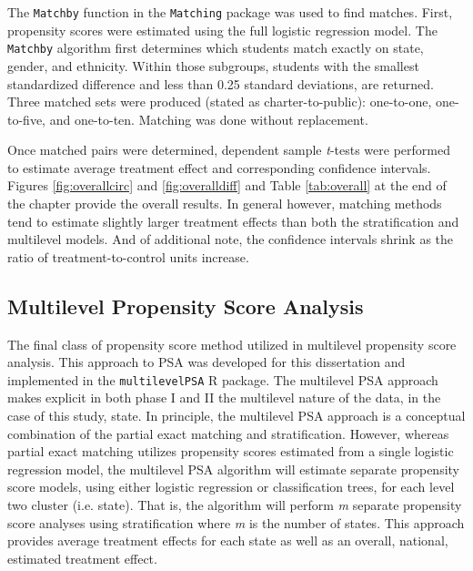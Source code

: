 \documentclass[letterpaper,12p,twoside]{article} %
\begin{document}
The \texttt{Matchby} function in the \texttt{Matching} package \cite{matching} was used to find matches. First, propensity scores were estimated using the full logistic regression model. The \texttt{Matchby} algorithm first determines which students match exactly on state, gender, and ethnicity. Within those subgroups, students with the smallest standardized difference and less than 0.25 standard deviations, are returned. Three matched sets were produced (stated as charter-to-public): one-to-one, one-to-five, and one-to-ten. Matching was done without replacement.

Once matched pairs were determined, dependent sample \textit{t}-tests were performed \cite{Austin2011} to estimate average treatment effect and corresponding confidence intervals. Figures \ref{fig:overallcirc} and \ref{fig:overalldiff} and Table \ref{tab:overall} at the end of the chapter provide the overall results. In general however, matching methods tend to estimate slightly larger treatment effects than both the stratification and multilevel models. And of additional note, the confidence intervals shrink as the ratio of treatment-to-control units increase.


\subsection{Multilevel Propensity Score Analysis}

The final class of propensity score method utilized in multilevel propensity score analysis. This approach to PSA was developed for this dissertation and implemented in the \texttt{multilevelPSA} R package. The multilevel PSA approach makes explicit in both phase I and II the multilevel nature of the data, in the case of this study, state. In principle, the multilevel PSA approach is a conceptual combination of the partial exact matching and stratification. However, whereas partial exact matching utilizes propensity scores estimated from a single logistic regression model, the multilevel PSA algorithm will estimate separate propensity score models, using either logistic regression or classification trees, for each level two cluster (i.e. state). That is, the algorithm will perform \textit{m} separate propensity score analyses using stratification where \textit{m} is the number of states. This approach provides average treatment effects for each state as well as an overall, national, estimated treatment effect.
\end{document}
